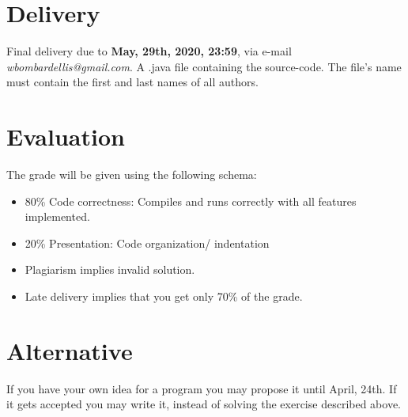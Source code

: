 \documentclass[a4paper]{article}
\begin{document}
	\section{Delivery}
	Final delivery due to \textbf{May, 29th, 2020, 23:59}, via e-mail \emph{wbombardellis@gmail.com}. A .java file containing the source-code. The file's name must contain the first and last names of all authors.

	\section{Evaluation}
	The grade will be given using the following schema:
	\begin{itemize}
		\item 80\% Code correctness: Compiles and runs correctly with all features implemented.
		\item 20\% Presentation: Code organization/ indentation
	\end{itemize}
	\par \par
	\begin{itemize}
		\item Plagiarism implies invalid solution.
		\item Late delivery implies that you get only 70\% of the grade.
	\end{itemize}

	\section{Alternative}
	If you have your own idea for a program you may propose it until April, 24th. If it gets accepted you may write it, instead of solving the exercise described above.
\end{document}
